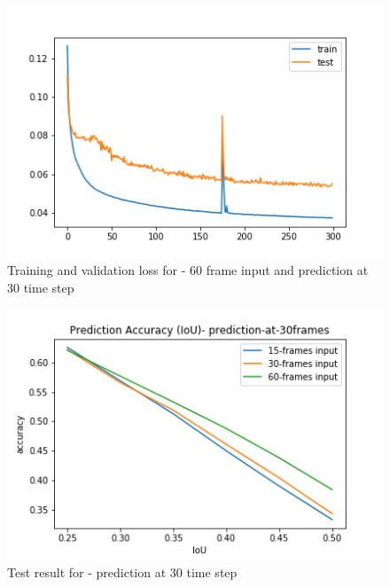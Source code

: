 \begin{figure}[H]
\includegraphics[scale=1.0]{conf11_300e_60_30ffuture}
\begin{center}
\caption{Training and validation loss for - 60 frame input and prediction at 30 time step }
\end{center}
\end{figure}

\begin{figure}[H]
\includegraphics[scale=1.0]{prediction-at-30frames_IoU}
\begin{center}
\caption{Test result for - prediction at 30 time step }
\end{center}
\end{figure}

